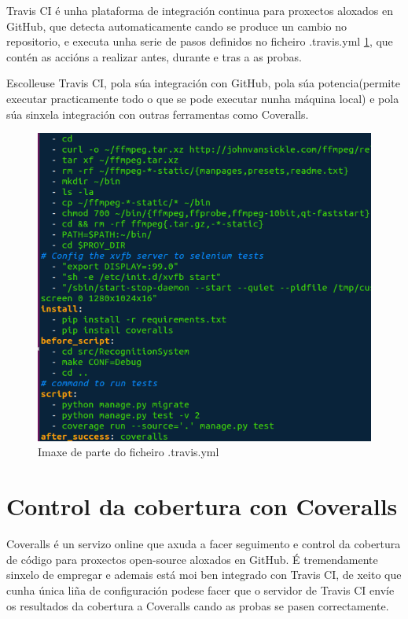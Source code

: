     Travis CI é unha plataforma de integración continua para proxectos aloxados en GitHub, que 
    detecta automaticamente cando se produce un cambio no repositorio, e executa unha serie de pasos 
    definidos no ficheiro .travis.yml \ref{fig:travisYml}, que contén as accións a realizar 
    antes, durante e tras a as probas.
    
    Escolleuse Travis CI, pola súa integración con GitHub, pola súa potencia(permite executar 
    practicamente todo o que se pode executar nunha máquina local) e pola súa sinxela integración
    con outras ferramentas como Coveralls.
    
    \begin{figure}[!htp]
    \begin{center}
        \includegraphics[scale=0.6]{figures/travisYml.png}
        \caption{Imaxe de parte do ficheiro .travis.yml}
    \label{fig:travisYml}
    \end{center}
    \end{figure}
    
    
\section{Control da cobertura con Coveralls}
    Coveralls é un servizo online que axuda a facer seguimento e control da cobertura de código para
    proxectos open-source aloxados en GitHub. É tremendamente sinxelo de empregar e ademais está moi
    ben integrado con Travis CI, de xeito que cunha única liña de configuración podese facer que o
    servidor de Travis CI envíe os resultados da cobertura a Coveralls cando as probas se pasen 
    correctamente.
    
